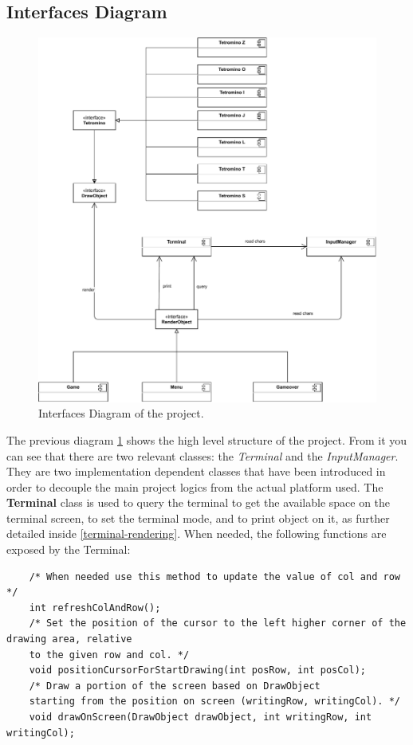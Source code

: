 \documentclass{article}
\begin{document}
\subsection{Interfaces Diagram}
\begin{figure}[H]
    \centering
    \includegraphics[width=\linewidth]{img/InterafcesDiagram.pdf}
    \caption{Interfaces Diagram of the project.}
    \label{fig:interface}
\end{figure}
The previous diagram \ref{fig:interface} shows the high level structure of the project. From it you can see that there are two relevant classes: the \textit{Terminal} and the \textit{InputManager}.
They are two implementation dependent classes that have been introduced in order to decouple the main project logics from the actual platform used.
The \textbf{Terminal} class is used to query the terminal to get the available space on the terminal screen, to set the terminal mode, and to print object on it, as further detailed inside \ref{terminal-rendering}.
When needed, the following functions are exposed by the Terminal:
\begin{verbatim}
    /* When needed use this method to update the value of col and row */
    int refreshColAndRow();
    /* Set the position of the cursor to the left higher corner of the drawing area, relative
    to the given row and col. */
    void positionCursorForStartDrawing(int posRow, int posCol);
    /* Draw a portion of the screen based on DrawObject
    starting from the position on screen (writingRow, writingCol). */
    void drawOnScreen(DrawObject drawObject, int writingRow, int writingCol);
\end{verbatim}
\end{document}

